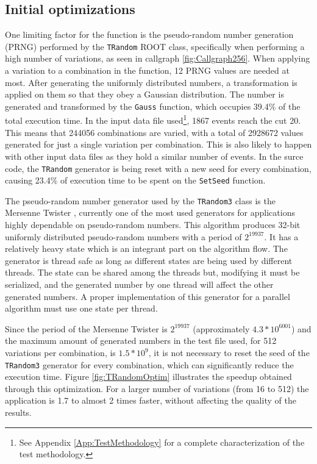 \subsection{Initial optimizations}
\label{InitialOptimizations}

One limiting factor for the \ttDilepKinFit function is the pseudo-random number generation (PRNG) performed by the \texttt{TRandom} ROOT class, specifically when performing a high number of variations, as seen in callgraph \ref{fig:Callgraph256}. When applying a variation to a combination in the \ttDilepKinFit function, 12 PRNG values are needed at most. After generating the uniformly distributed numbers, a transformation is applied on them so that they obey a Gaussian distribution. The number is generated and transformed by the \texttt{Gauss} function, which occupies 39.4\% of the total execution time. In the input data file used\footnote{See Appendix \ref{App:TestMethodology} for a complete characterization of the test methodology.}, 1867 events reach the cut 20. This means that 244056 combinations are varied, with a total of 2928672 values generated for just a single variation per combination. This is also likely to happen with other input data files as they hold a similar number of events. In the \ttDilepKinFit surce code, the \texttt{TRandom} generator is being reset with a new seed for every combination, causing 23.4\% of execution time to be spent on the \texttt{SetSeed} function.

The pseudo-random number generator used by the \texttt{TRandom3} class is the Mersenne Twister \cite{MersenneTwister}, currently one of the most used generators for applications highly dependable on pseudo-random numbers. This algorithm produces 32-bit uniformly distributed pseudo-random numbers with a period of $2^{19937}$. It has a relatively heavy state which is an integrant part on the algorithm flow. The generator is thread safe as long as different states are being used by different threads. The state can be shared among the threads but, modifying it must be serialized, and the generated number by one thread will affect the other generated numbers. A proper implementation of this generator for a parallel algorithm must use one state per thread.

Since the period of the Mersenne Twister is $2^{19937}$ (approximately $4.3 * 10^{6001}$) and the maximum amount of generated numbers in the test file used, for 512 variations per combination, is $1.5 * 10^{9}$, it is not necessary to reset the seed of the \texttt{TRandom3} generator for every combination, which can significantly reduce the \ttDilepKinFit execution time. Figure \ref{fig:TRandomOptim} illustrates the speedup obtained through this optimization. For a larger number of variations (from 16 to 512) the application is 1.7 to almost 2 times faster, without affecting the quality of the results.

